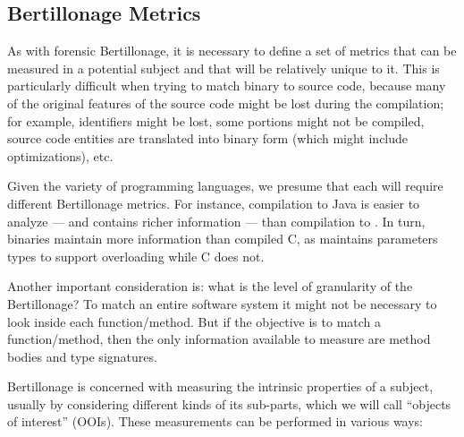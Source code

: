 \subsection{Bertillonage Metrics}

As with forensic Bertillonage, it is necessary to define a set of metrics
that can be measured in a potential subject and that will be relatively
unique to it.  This is particularly difficult when trying to match binary
to source code, because many of the original features of the source code
might be lost during the compilation; for example, identifiers might be
lost, some portions might not be compiled, source code entities are
translated into binary form (which might include optimizations), etc. 

Given the variety of programming languages, we presume that each will
require different Bertillonage metrics. For instance, compilation to Java
is easier to analyze --- and contains richer information --- than
compilation to \Cpp. In turn, \Cpp binaries maintain more information than
compiled C, as \Cpp maintains parameters types to support overloading while
C does not.

Another important consideration is: what is the level of granularity of the
Bertillonage? To match an entire software system it might not be necessary
to look inside each function/method. But if the objective is to match a
function/method, then the only information available to measure are method
bodies and type signatures.

Bertillonage is concerned with measuring the intrinsic properties of a
subject, usually by considering different kinds of its sub-parts, which we
will call ``objects of interest'' (OOIs).  These measurements can be
performed in various ways:

